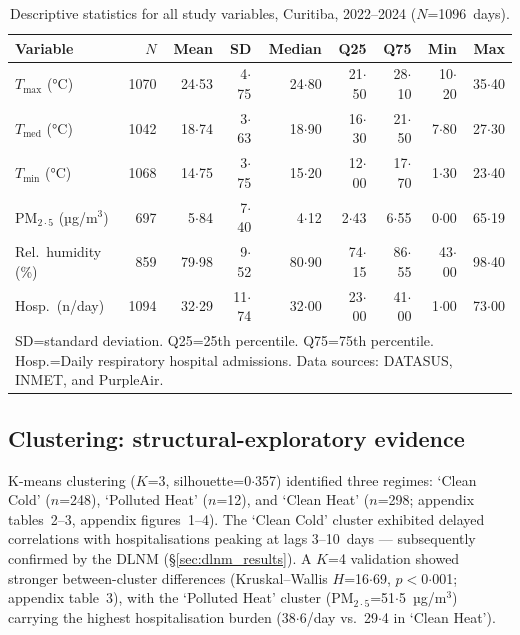 \documentclass[review,number]{elsarticle}
\begin{document}
\begin{table}[ht]
\centering
\caption{Descriptive statistics for all study variables, Curitiba,
2022--2024 ($N$=1096~days).}
\label{tab:descriptive}
\begin{tabular}{lrrrrrrrr}
\toprule
Variable & $N$ & Mean & SD & Median & Q25 & Q75 & Min & Max \\
\midrule
$T_\mathrm{max}$ (°C) & 1070 & 24${\cdot}$53 & 4${\cdot}$75 & 24${\cdot}$80 & 21${\cdot}$50 & 28${\cdot}$10 & 10${\cdot}$20 & 35${\cdot}$40 \\
$T_\mathrm{med}$ (°C) & 1042 & 18${\cdot}$74 & 3${\cdot}$63 & 18${\cdot}$90 & 16${\cdot}$30 & 21${\cdot}$50 &  7${\cdot}$80 & 27${\cdot}$30 \\
$T_\mathrm{min}$ (°C) & 1068 & 14${\cdot}$75 & 3${\cdot}$75 & 15${\cdot}$20 & 12${\cdot}$00 & 17${\cdot}$70 &  1${\cdot}$30 & 23${\cdot}$40 \\
$\text{PM}_{2{\cdot}5}$ (µg/m$^3$) &  697 &  5${\cdot}$84 & 7${\cdot}$40 &  4${\cdot}$12 &  2${\cdot}$43 &  6${\cdot}$55 &  0${\cdot}$00 & 65${\cdot}$19 \\
Rel.\ humidity (\%)     &  859 & 79${\cdot}$98 &  9${\cdot}$52 & 80${\cdot}$90 & 74${\cdot}$15 & 86${\cdot}$55 & 43${\cdot}$00 & 98${\cdot}$40 \\
Hosp.\ (n/day)   & 1094 & 32${\cdot}$29 & 11${\cdot}$74 & 32${\cdot}$00 & 23${\cdot}$00 & 41${\cdot}$00 & 1${\cdot}$00 & 73${\cdot}$00 \\
\bottomrule
\multicolumn{9}{p{0.95\textwidth}}{\footnotesize SD=standard deviation.
Q25=25th percentile. Q75=75th percentile. Hosp.=Daily respiratory
hospital admissions. Data sources: DATASUS, INMET, and PurpleAir.}
\end{tabular}
\end{table}

\subsection{Clustering: structural-exploratory evidence}

K-means clustering ($K$=3, silhouette=0${\cdot}$357) identified three
regimes: `Clean Cold' ($n$=248), `Polluted Heat' ($n$=12), and `Clean Heat'
($n$=298; appendix tables~2--3, appendix figures~1--4).\cite{Rousseeuw1987} The
`Clean Cold' cluster exhibited delayed correlations with
hospitalisations peaking at lags 3--10~days --- subsequently confirmed
by the DLNM (§\ref{sec:dlnm_results}). A $K$=4 validation showed
stronger between-cluster differences (Kruskal--Wallis $H$=16${\cdot}$69,
$p$$<$0${\cdot}$001; appendix table~3), with the `Polluted Heat' cluster
($\text{PM}_{2{\cdot}5}$=51${\cdot}$5~µg/m$^3$) carrying the highest
hospitalisation burden (38${\cdot}$6/day vs.\ 29${\cdot}$4 in `Clean Heat').
\end{document}
